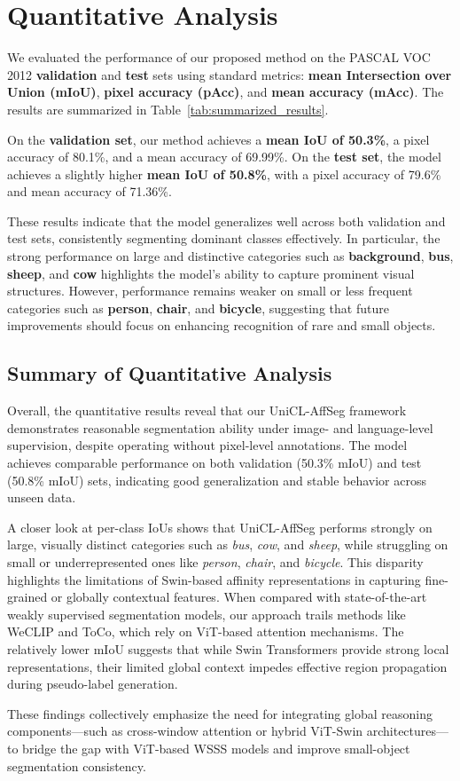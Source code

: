 \section{Quantitative Analysis}
\label{sec:quantitative_analysis}

We evaluated the performance of our proposed method on the PASCAL VOC 2012 \textbf{validation} and \textbf{test} sets using standard metrics: \textbf{mean Intersection over Union (mIoU)}, \textbf{pixel accuracy (pAcc)}, and \textbf{mean accuracy (mAcc)}. The results are summarized in Table~\ref{tab:summarized_results}. 

On the \textbf{validation set}, our method achieves a \textbf{mean IoU of 50.3\%}, a pixel accuracy of 80.1\%, and a mean accuracy of 69.99\%.  
On the \textbf{test set}, the model achieves a slightly higher \textbf{mean IoU of 50.8\%}, with a pixel accuracy of 79.6\% and mean accuracy of 71.36\%.  

These results indicate that the model generalizes well across both validation and test sets, consistently segmenting dominant classes effectively. In particular, the strong performance on large and distinctive categories such as \textbf{background}, \textbf{bus}, \textbf{sheep}, and \textbf{cow} highlights the model's ability to capture prominent visual structures. However, performance remains weaker on small or less frequent categories such as \textbf{person}, \textbf{chair}, and \textbf{bicycle}, suggesting that future improvements should focus on enhancing recognition of rare and small objects.






\subsection{Summary of Quantitative Analysis}
\label{subsubsec:quantitative_summary}

Overall, the quantitative results reveal that our UniCL-AffSeg framework demonstrates reasonable segmentation ability under image- and language-level supervision, despite operating without pixel-level annotations. The model achieves comparable performance on both validation (50.3\% mIoU) and test (50.8\% mIoU) sets, indicating good generalization and stable behavior across unseen data. 

A closer look at per-class IoUs shows that UniCL-AffSeg performs strongly on large, visually distinct categories such as \textit{bus}, \textit{cow}, and \textit{sheep}, while struggling on small or underrepresented ones like \textit{person}, \textit{chair}, and \textit{bicycle}. This disparity highlights the limitations of Swin-based affinity representations in capturing fine-grained or globally contextual features. When compared with state-of-the-art weakly supervised segmentation models, our approach trails methods like WeCLIP and ToCo, which rely on ViT-based attention mechanisms. The relatively lower mIoU suggests that while Swin Transformers provide strong local representations, their limited global context impedes effective region propagation during pseudo-label generation. 

These findings collectively emphasize the need for integrating global reasoning components—such as cross-window attention or hybrid ViT-Swin architectures—to bridge the gap with ViT-based WSSS models and improve small-object segmentation consistency.

